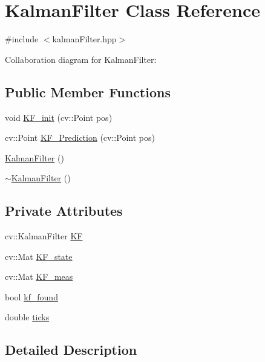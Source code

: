 \hypertarget{class_kalman_filter}{}\section{Kalman\+Filter Class Reference}
\label{class_kalman_filter}


{\ttfamily \#include $<$kalman\+Filter.\+hpp$>$}



Collaboration diagram for Kalman\+Filter\+:
\subsection*{Public Member Functions}
\begin{DoxyCompactItemize}
\item 
void \hyperlink{class_kalman_filter_adcf29bef64e646e9cff6d15cb88b5896}{K\+F\+\_\+init} (cv\+::\+Point pos)
\item 
cv\+::\+Point \hyperlink{class_kalman_filter_adddba8eba0982a9042a9524adad3f8a7}{K\+F\+\_\+\+Prediction} (cv\+::\+Point pos)
\item 
\hyperlink{class_kalman_filter_aab2cc3677e9fcb19fff16b84c997f30a}{Kalman\+Filter} ()
\item 
\hyperlink{class_kalman_filter_af01e932cd20cec5dd06ca5d8f0b722f4}{$\sim$\+Kalman\+Filter} ()
\end{DoxyCompactItemize}
\subsection*{Private Attributes}
\begin{DoxyCompactItemize}
\item 
cv\+::\+Kalman\+Filter \hyperlink{class_kalman_filter_a486d5802080222974f49454c59b71d83}{KF}
\item 
cv\+::\+Mat \hyperlink{class_kalman_filter_a279304db3b9574783b2724ab2ed989af}{K\+F\+\_\+state}
\item 
cv\+::\+Mat \hyperlink{class_kalman_filter_ab8ea794012f17385fead830634b1c1ed}{K\+F\+\_\+meas}
\item 
bool \hyperlink{class_kalman_filter_a85ee09dd912c76ebcdbfa204153e28c1}{kf\+\_\+found}
\item 
double \hyperlink{class_kalman_filter_a9f9d6412ec56e87e78fe1de185bef4b8}{ticks}
\end{DoxyCompactItemize}


\subsection{Detailed Description}



